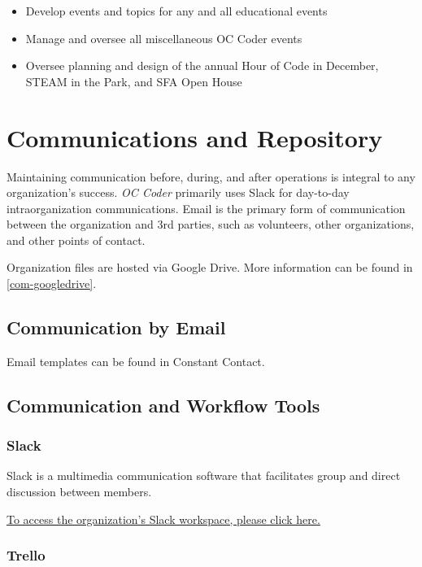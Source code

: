\documentclass[twoside,11pt,letterpaper,abstracton]{scrartcl}
\begin{document}
\begin{itemize}
    \item Develop events and topics for any and all educational events
    \item Manage and oversee all miscellaneous OC Coder events
    \item Oversee planning and design of the annual Hour of Code in December, STEAM in the Park, and SFA Open House
\end{itemize}

\newpage

\section{Communications and Repository}

Maintaining communication before, during, and after operations is integral to any organization's success. \emph{OC Coder} primarily uses Slack for day-to-day intraorganization communications. Email is the primary form of communication between the organization and 3rd parties, such as volunteers, other organizations, and other points of contact. 

Organization files are hosted via Google Drive. More information can be found in \ref{com-googledrive}.

\subsection{Communication by Email}

Email templates can be found in Constant Contact.

\subsection{Communication and Workflow Tools}

\subsubsection{Slack}

Slack is a multimedia communication software that facilitates group and direct discussion between members. 

\begin{resource}
    \href{}{To access the organization's Slack workspace, please click here.}
\end{resource}

\subsubsection{Trello}
\end{document}
